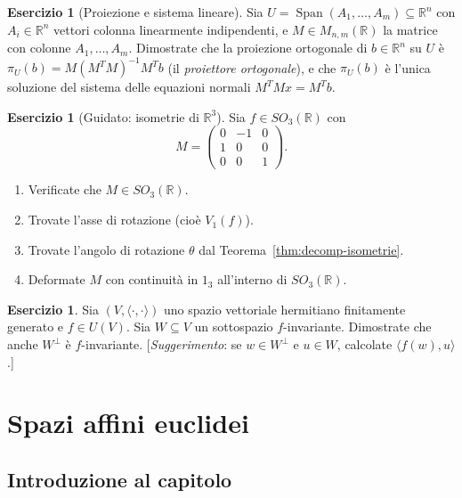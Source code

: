 \documentclass[11pt, a4paper]{book}
\theoremstyle{definition}
\newtheorem{esercizio}[definizione]{Esercizio}
\theoremstyle{plain}
\theoremstyle{remark}
\newcommand{\R}{\mathbb{R}}
\DeclareMathOperator{\Span}{Span}
\begin{document}
\begin{esercizio}[Proiezione e sistema lineare]
Sia $U = \Span(A_1,\ldots,A_m) \subseteq \R^n$ con $A_i \in \R^n$ vettori colonna linearmente indipendenti, e $M \in M_{n,m}(\R)$ la matrice con colonne $A_1,\ldots,A_m$. Dimostrate che la proiezione ortogonale di $b \in \R^n$ su $U$ è $\pi_U(b) = M(M^T M)^{-1}M^T b$ (il \emph{proiettore ortogonale}), e che $\pi_U(b)$ è l'unica soluzione del sistema delle equazioni normali $M^T M x = M^T b$.
\end{esercizio}

\begin{esercizio}[Guidato: isometrie di $\R^3$]
Sia $f \in SO_3(\R)$ con
\[
  M = \begin{pmatrix}0&-1&0\\1&0&0\\0&0&1\end{pmatrix}.
\]
\begin{enumerate}
  \item Verificate che $M \in SO_3(\R)$.
  \item Trovate l'asse di rotazione (cioè $V_1(f)$).
  \item Trovate l'angolo di rotazione $\theta$ dal Teorema~\ref{thm:decomp-isometrie}.
  \item Deformate $M$ con continuità in $1_3$ all'interno di $SO_3(\R)$.
\end{enumerate}
\end{esercizio}

\begin{esercizio}
Sia $(V,\langle\cdot,\cdot\rangle)$ uno spazio vettoriale hermitiano finitamente generato e $f \in U(V)$. Sia $W \subseteq V$ un sottospazio $f$-invariante. Dimostrate che anche $W^\perp$ è $f$-invariante. [\emph{Suggerimento}: se $w \in W^\perp$ e $u \in W$, calcolate $\langle f(w), u\rangle$.]
\end{esercizio}

\chapter{Spazi affini euclidei}
\label{cap:affini-euclidei}

\section*{Introduzione al capitolo}
\end{document}
